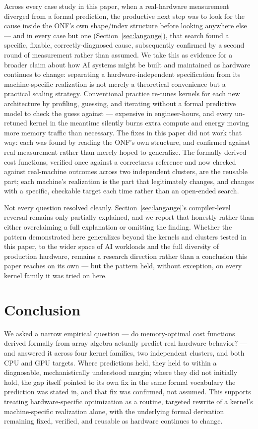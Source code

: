 \documentclass[conference]{IEEEtran}
\begin{document}
Across every case study in this paper, when a real-hardware measurement
diverged from a formal prediction, the productive next step was to
look for the cause inside the ONF's own shape/index structure before
looking anywhere else --- and in every case but one
(Section~\ref{sec:langauge}), that search found a specific, fixable,
correctly-diagnosed cause, subsequently confirmed by a second round of
measurement rather than assumed. We take this as evidence for a
broader claim about how AI systems might be built and maintained as
hardware continues to change: separating a hardware-independent
specification from its machine-specific realization is not merely a
theoretical convenience but a practical scaling strategy. Conventional
practice re-tunes kernels for each new architecture by profiling,
guessing, and iterating without a formal predictive model to check the
guess against --- expensive in engineer-hours, and every un-retuned
kernel in the meantime silently burns extra compute and energy moving
more memory traffic than necessary. The fixes in this paper did not
work that way: each was found by reading the ONF's own structure, and
confirmed against real measurement rather than merely hoped to
generalize. The formally-derived cost functions, verified once against
a correctness reference and now checked against real-machine outcomes
across two independent clusters, are the reusable part; each machine's
realization is the part that legitimately changes, and changes with a
specific, checkable target each time rather than an open-ended search.

Not every question resolved cleanly. Section~\ref{sec:langauge}'s
compiler-level reversal remains only partially explained, and we report
that honestly rather than either overclaiming a full explanation or
omitting the finding. Whether the pattern demonstrated here generalizes
beyond the kernels and clusters tested in this paper, to the wider
space of AI workloads and the full diversity of production hardware,
remains a research direction rather than a conclusion this paper
reaches on its own --- but the pattern held, without exception, on
every kernel family it was tried on here.

\section{Conclusion}

We asked a narrow empirical question --- do memory-optimal cost
functions derived formally from array algebra actually predict real
hardware behavior? --- and answered it across four kernel families, two
independent clusters, and both CPU and GPU targets. Where predictions
held, they held to within a diagnosable, mechanistically understood
margin; where they did not initially hold, the gap itself pointed to
its own fix in the same formal vocabulary the prediction was stated in,
and that fix was confirmed, not assumed. This supports treating
hardware-specific optimization as a routine, targeted rewrite of a
kernel's machine-specific realization alone, with the underlying formal
derivation remaining fixed, verified, and reusable as hardware
continues to change.
\end{document}
